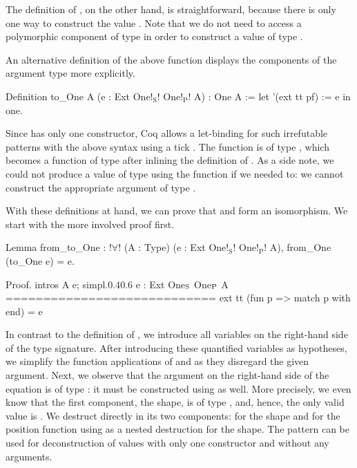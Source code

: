 The definition of , on the other hand, is straightforward, because there is only one way to construct the value .
Note that we do not need to access a polymorphic component of type  in order to construct a value of type .

An alternative definition of the above function displays the components of the argument type  more explicitly.

\begin{coqcode}
Definition to_One A (e : Ext One!$_\text{S}$! One!$_\text{P}$! A) : One A :=
  let '(ext tt pf) := e in one.
\end{coqcode}

Since  has only one constructor, Coq allows a let\--binding for such irrefutable patterns with the above syntax using a tick .
The function  is of type , which becomes a function of type  after inlining the definition of .
As a side note, we could not produce a value of type  using the function  if we needed to: we cannot construct the appropriate argument of type .

With these definitions at hand, we can prove that  and  form an isomorphism.
We start with the more involved proof  first.

\begin{coqcode}
Lemma from_to_One : !$\forall$! (A : Type) (e : Ext One!$_\text{S}$! One!$_\text{P}$! A),
    from_One (to_One e) = e.
\end{coqcode}

\begin{cproof1}{Proof. intros A e; simpl.}{0.4}{0.6}
  e : Ext One\(\sb{\text{S}}\) One\(\sb{\text{P}}\) A
  ============================
  ext tt (fun p => match p with end) = e
\end{cproof1}

In contrast to the definition of , we introduce all variables on the right\--hand side of the type signature.
After introducing these quantified variables as hypotheses, we simplify the function applications of  and  as they disregard the given argument.
Next, we observe that the argument  on the right\--hand side of the equation is of type : it must be constructed using  as well.
More precisely, we even know that the first component, the shape, is of type , and, hence, the only valid value is .
We destruct  directly in its two components:  for the shape and  for the position function using \cinl{[]} as a nested destruction for the shape.
The pattern \cinl{[]} can be used for deconstruction of values with only one constructor and without any arguments.


